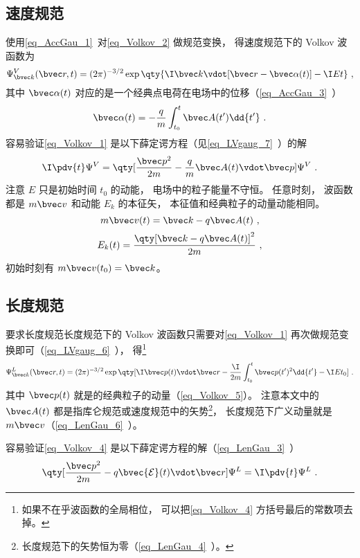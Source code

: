 \subsection{速度规范}
使用\autoref{eq_AccGau_1}~对\autoref{eq_Volkov_2} 做规范变换， 得速度规范下的 Volkov 波函数为
\begin{equation}\label{eq_Volkov_1}
\Psi_{\bvec k}^V(\bvec r, t) = (2\pi)^{-3/2} \exp\qty{\I \bvec k \vdot [\bvec r - \bvec \alpha(t)] - \I E t}~,
\end{equation}
其中 $\bvec \alpha(t)$ 对应的是一个经典点电荷在电场中的位移（\autoref{eq_AccGau_3}~）
\begin{equation}
\bvec \alpha(t) = -\frac{q}{m} \int_{t_0}^t \bvec A(t') \dd{t'}~.
\end{equation}
容易验证\autoref{eq_Volkov_1} 是以下薛定谔方程（见\autoref{eq_LVgaug_7}~）的解
\begin{equation}
\I \pdv{t} \Psi^V = \qty[\frac{\bvec p^2}{2m} - \frac{q}{m}\bvec A(t) \vdot \bvec p] \Psi^V~.
\end{equation}
注意 $E$ 只是初始时间 $t_0$ 的动能， 电场中的粒子能量不守恒。 任意时刻， 波函数都是 $m\bvec v$ 和动能 $E_k$ 的本征矢， 本征值和经典粒子的动量动能相同。
\begin{equation}\label{eq_Volkov_5}
m\bvec v(t) = \bvec k - q\bvec A(t)~,
\end{equation}
\begin{equation}
E_k(t) = \frac{\qty[\bvec k - q\bvec A(t)]^2}{2m}~,
\end{equation}
初始时刻有 $ m\bvec v(t_0) = \bvec k$。

\subsection{长度规范}
要求长度规范长度规范下的 Volkov 波函数只需要对\autoref{eq_Volkov_1} 再次做规范变换即可（\autoref{eq_LVgaug_6}~）， 得\footnote{如果不在乎波函数的全局相位， 可以把\autoref{eq_Volkov_4} 方括号最后的常数项去掉。}
\begin{equation}\label{eq_Volkov_4}
\Psi_{\bvec k}^L(\bvec r, t) = (2\pi)^{-3/2} \exp\qty[\I \bvec p(t)\vdot \bvec r - \frac{\I}{2m}\int_{t_0}^t \bvec p(t')^2 \dd{t'} - \I E t_0]~.
\end{equation}
其中 $\bvec p(t)$ 就是的经典粒子的动量（\autoref{eq_Volkov_5}）。 注意本文中的 $\bvec A(t)$ 都是指库仑规范或速度规范中的矢势\footnote{长度规范下的矢势恒为零（\autoref{eq_LenGau_4}~）。}， 长度规范下广义动量就是 $m\bvec v$（\autoref{eq_LenGau_6}~）。

容易验证\autoref{eq_Volkov_4} 是以下薛定谔方程的解（\autoref{eq_LenGau_3}~）
\begin{equation}
\qty[\frac{\bvec p^2}{2m} - q \bvec {\mathcal E}(t) \vdot \bvec r] \Psi^L = \I \pdv{t} \Psi^L~.
\end{equation}
